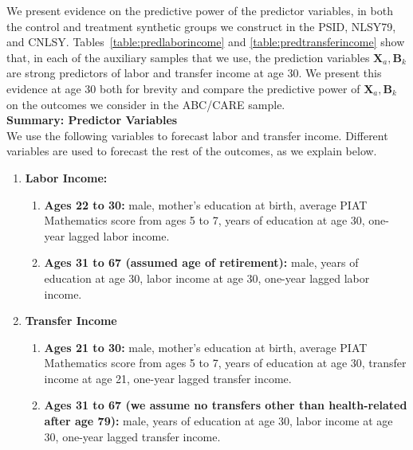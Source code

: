 \noindent We present evidence on the predictive power of the predictor variables, in both the control and treatment synthetic groups we construct in the PSID, NLSY79, and CNLSY. Tables~\ref{table:predlaborincome} and \ref{table:predtransferincome} show that, in each of the auxiliary samples that we use, the prediction variables $\bm{X}_{a}, \bm{B}_k$ are strong predictors of labor and transfer income at age 30. We present this evidence at age 30 both for brevity and compare the predictive power of $\bm{X}_{a},\bm{B}_k$ on the outcomes we consider in the ABC/CARE sample.\\

\noindent \textbf{Summary: Predictor Variables}\\
\noindent We use the following variables to forecast labor and transfer income. Different variables are used to forecast the rest of the outcomes, as we explain below.
\begin{enumerate}
\item \textbf{Labor Income:}
\begin{enumerate}
\item \textbf{Ages 22 to 30:} male, mother's education at birth, average PIAT Mathematics score from ages 5 to 7, years of education at age 30, one-year lagged labor income.
\item \textbf{Ages 31 to 67 (assumed age of retirement):} male, years of education at age 30, labor income at age 30, one-year lagged labor income.
\end{enumerate}
\item \textbf{Transfer Income}
\begin{enumerate}
\item \textbf{Ages 21 to 30:} male, mother's education at birth, average PIAT Mathematics score from ages 5 to 7, years of education at age 30, transfer income at age 21, one-year lagged transfer income.
\item \textbf{Ages 31 to 67 (we assume no transfers other than health-related after age 79):} male, years of education at age 30, labor income at age 30, one-year lagged transfer income.
\end{enumerate}
\end{enumerate}

